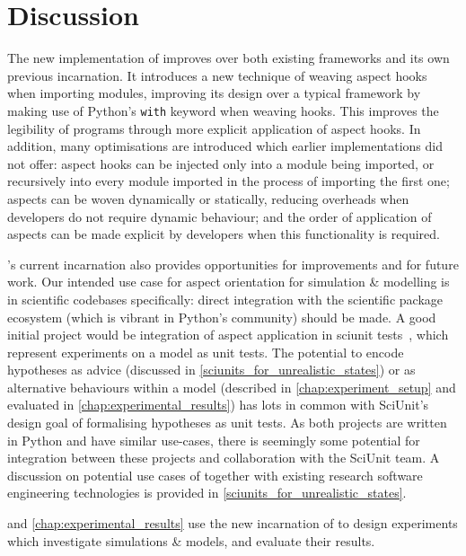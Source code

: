 \section{Discussion}
\label{pdsf3_discussion}

The new implementation of \pdsf{} improves over both existing \aop{}
frameworks
and its own previous incarnation. It introduces a new technique of weaving
aspect hooks when importing modules, improving its design over a typical
\aspectorientation{} framework by making use of Python's \lstinline{with}
keyword when weaving hooks. This improves the legibility of \aspectoriented{}
programs through more explicit application of aspect hooks. In addition, many
optimisations are introduced which earlier \pdsf{} implementations did not
offer: aspect hooks can be injected only into a module being imported, or
recursively into every module imported in the process of importing the first
one; aspects can be woven dynamically or statically, reducing overheads when
developers do not require dynamic behaviour; and the order of application of
aspects can be made explicit by developers when this functionality is required.

\pdsf{}'s current incarnation also provides opportunities for improvements and
for future work. Our intended use case for aspect orientation for simulation \&
modelling is in scientific codebases specifically: direct integration with the
scientific package ecosystem (which is vibrant in Python's community) should be
made. A good initial project would be integration of aspect application in
sciunit tests~\cite{sciunit_primer}, which represent experiments on a model as
unit tests. The potential to encode hypotheses as advice (discussed in
\cref{sciunits_for_unrealistic_states}) or as alternative behaviours within a
model (described in \cref{chap:experiment_setup} and evaluated in
\cref{chap:experimental_results}) has lots in common with SciUnit's design goal
of formalising hypotheses as unit tests. As both projects are written in Python
and have similar use-cases, there is seemingly some potential for integration
between these projects and collaboration with the SciUnit team. A discussion on
potential use cases of \pdsf together with existing research software
engineering technologies is provided in \cref{sciunits_for_unrealistic_states}.

 and \cref{chap:experimental_results} use the new
incarnation of \pdsf{} to design experiments which investigate \aspectoriented{}
simulations \& models, and evaluate their results.
